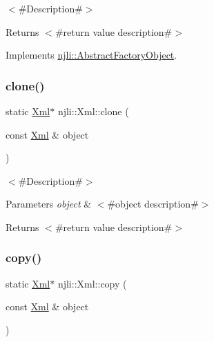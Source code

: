 $<$\#\+Description\#$>$

\begin{DoxyReturn}{Returns}
$<$\#return value description\#$>$ 
\end{DoxyReturn}


Implements \mbox{\hyperlink{classnjli_1_1_abstract_factory_object_a4763d05bc9dc37c559111f8bb30e1dd8}{njli\+::\+Abstract\+Factory\+Object}}.

\mbox{\label{classnjli_1_1_xml_ac52e78b6e638a84fd79179d4d27371f8}} 
\subsubsection{\texorpdfstring{clone()}{clone()}}
{\footnotesize\ttfamily static \mbox{\hyperlink{classnjli_1_1_xml}{Xml}}$\ast$ njli\+::\+Xml\+::clone (\begin{DoxyParamCaption}\item[{const \mbox{\hyperlink{classnjli_1_1_xml}{Xml}} \&}]{object }\end{DoxyParamCaption})\hspace{0.3cm}{\ttfamily [static]}}

$<$\#\+Description\#$>$


\begin{DoxyParams}{Parameters}
{\em object} & $<$\#object description\#$>$\\
\hline
\end{DoxyParams}
\begin{DoxyReturn}{Returns}
$<$\#return value description\#$>$ 
\end{DoxyReturn}
\mbox{\label{classnjli_1_1_xml_adc452dbd5211848fb2c09086d0ba9af3}} 
\subsubsection{\texorpdfstring{copy()}{copy()}}
{\footnotesize\ttfamily static \mbox{\hyperlink{classnjli_1_1_xml}{Xml}}$\ast$ njli\+::\+Xml\+::copy (\begin{DoxyParamCaption}\item[{const \mbox{\hyperlink{classnjli_1_1_xml}{Xml}} \&}]{object }\end{DoxyParamCaption})\hspace{0.3cm}{\ttfamily [static]}}

